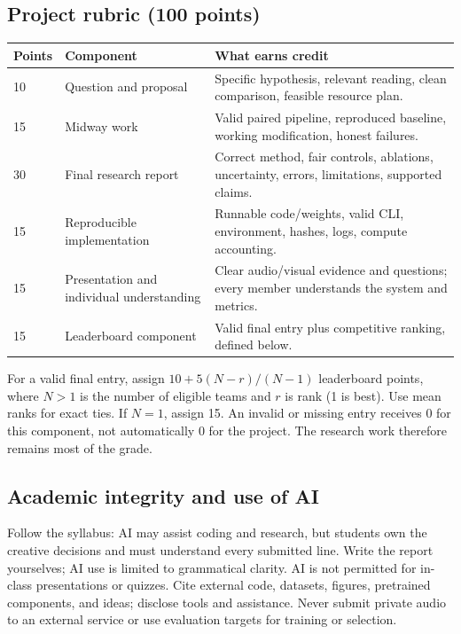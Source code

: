 \documentclass[11pt,letterpaper]{article}
\begin{document}
\subsection{Project rubric (100 points)}
\begin{center}\small
\begin{tabularx}{\linewidth}{@{}p{.55in}p{1.75in}Y@{}}
\toprule
Points & Component & What earns credit\\ & Question and proposal & Specific hypothesis, relevant reading, clean comparison, feasible resource plan.\\
15 & Midway work & Valid paired pipeline, reproduced baseline, working modification, honest failures.\\
30 & Final research report & Correct method, fair controls, ablations, uncertainty, errors, limitations, supported claims.\\
15 & Reproducible implementation & Runnable code/weights, valid CLI, environment, hashes, logs, compute accounting.\\
15 & Presentation and individual understanding & Clear audio/visual evidence and questions; every member understands the system and metrics.\\
15 & Leaderboard component & Valid final entry plus competitive ranking, defined below.\\
\bottomrule
\end{tabularx}
\end{center}

For a valid final entry, assign $10+5(N-r)/(N-1)$ leaderboard points, where $N>1$ is the number of eligible teams and $r$ is rank (1 is best). Use mean ranks for exact ties. If $N=1$, assign 15. An invalid or missing entry receives 0 for this component, not automatically 0 for the project. The research work therefore remains most of the grade.

\subsection{Academic integrity and use of AI}
Follow the syllabus: AI may assist coding and research, but students own the creative decisions and must understand every submitted line. Write the report yourselves; AI use is limited to grammatical clarity. AI is not permitted for in-class presentations or quizzes. Cite external code, datasets, figures, pretrained components, and ideas; disclose tools and assistance. Never submit private audio to an external service or use evaluation targets for training or selection.
\end{document}
